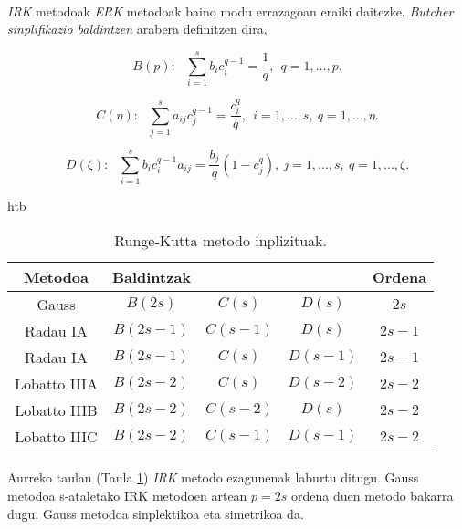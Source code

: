 \paragraph*{} \emph{IRK} metodoak \emph{ERK} metodoak baino modu errazagoan eraiki daitezke.  \emph{Butcher sinplifikazio baldintzen} \cite{Butcher2008} arabera definitzen dira,

\begin{equation*}
B(p): \ \ \ \sum\limits_{i=1}^{s} b_ic_i^{q-1}=\frac{1}{q}, \ \ q=1,\dots,p.
\end{equation*}

\begin{equation*}
C(\eta): \ \ \ \sum\limits_{j=1}^{s} a_{ij}c_j^{q-1}=\frac{c_i^q}{q}, \ \ i=1,\dots,s, \ q=1,\dots,\eta.
\end{equation*}

\begin{equation*}
D(\zeta):  \ \ \ \sum\limits_{i=1}^{s}  b_i c_i^{q-1}  a_{ij}  = \frac{b_j}{q} (1-c_j^q),  \ j=1,\dots,s, \ q=1,\dots,\zeta.
\end{equation*}

\begin{table}{htb}
\caption{Runge-Kutta metodo inplizituak.}
\label{tab:21}       %
\begin{tabular}{ c c c c c } 
 \hline
 Metodoa          &  Baldintzak             &                        &                 & Ordena \\
 \hline
 Gauss            &  $B(2s)$                & $C(s)$                 & $D(s)$          & $2s$    \\
 \hline
 Radau IA         &  $B(2s-1)$              & $C(s-1)$               & $D(s)$          & $2s-1$  \\
 \hline 
 Radau IA         &  $B(2s-1)$              & $C(s)$                 & $D(s-1)$        & $2s-1$  \\
 \hline 
 Lobatto IIIA     &  $B(2s-2)$              & $C(s)$                 & $D(s-2)$        & $2s-2$  \\
 \hline
 Lobatto IIIB     &  $B(2s-2)$              & $C(s-2)$               & $D(s)$          & $2s-2$  \\
 \hline 
 Lobatto IIIC     &  $B(2s-2)$              & $C(s-1)$               & $D(s-1)$        & $2s-2$  \\
  \hline
 \end{tabular}
\end{table}

\paragraph*{}Aurreko taulan (Taula \ref{tab:21}) \emph{IRK} metodo ezagunenak laburtu ditugu. Gauss metodoa s-ataletako IRK metodoen artean $p=2s$ ordena duen metodo bakarra dugu. Gauss metodoa sinplektikoa eta simetrikoa da.


